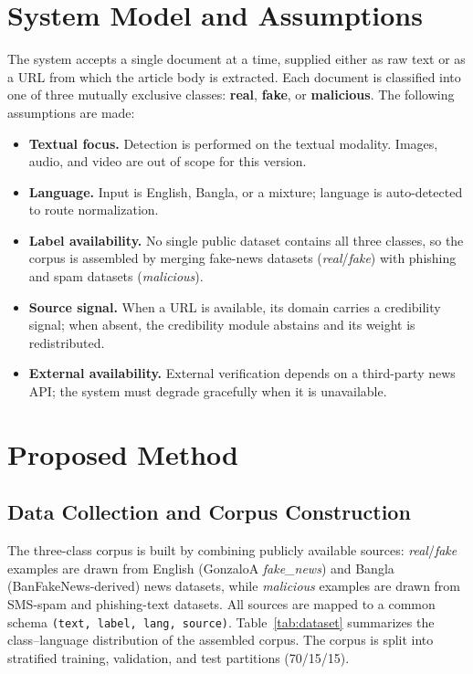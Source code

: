 \section{System Model and Assumptions}
\label{sec:assumptions}
The system accepts a single document at a time, supplied either as raw text or as
a URL from which the article body is extracted. Each document is classified into
one of three mutually exclusive classes: \textbf{real}, \textbf{fake}, or
\textbf{malicious}. The following assumptions are made:
\begin{itemize}
  \item \textbf{Textual focus.} Detection is performed on the textual modality.
        Images, audio, and video are out of scope for this version.
  \item \textbf{Language.} Input is English, Bangla, or a mixture; language is
        auto-detected to route normalization.
  \item \textbf{Label availability.} No single public dataset contains all three
        classes, so the corpus is assembled by merging fake-news datasets
        (\emph{real}/\emph{fake}) with phishing and spam datasets (\emph{malicious}).
  \item \textbf{Source signal.} When a URL is available, its domain carries a
        credibility signal; when absent, the credibility module abstains and its
        weight is redistributed.
  \item \textbf{External availability.} External verification depends on a
        third-party news API; the system must degrade gracefully when it is
        unavailable.
\end{itemize}

\section{Proposed Method}
\label{sec:method}

\subsection{Data Collection and Corpus Construction}
The three-class corpus is built by combining publicly available sources:
\emph{real}/\emph{fake} examples are drawn from English (GonzaloA \emph{fake\_news})
and Bangla (BanFakeNews-derived) news datasets, while \emph{malicious} examples
are drawn from SMS-spam and phishing-text datasets. All sources are mapped to a
common schema \texttt{(text, label, lang, source)}. Table~\ref{tab:dataset}
summarizes the class--language distribution of the assembled corpus. The corpus
is split into stratified training, validation, and test partitions (70/15/15).

